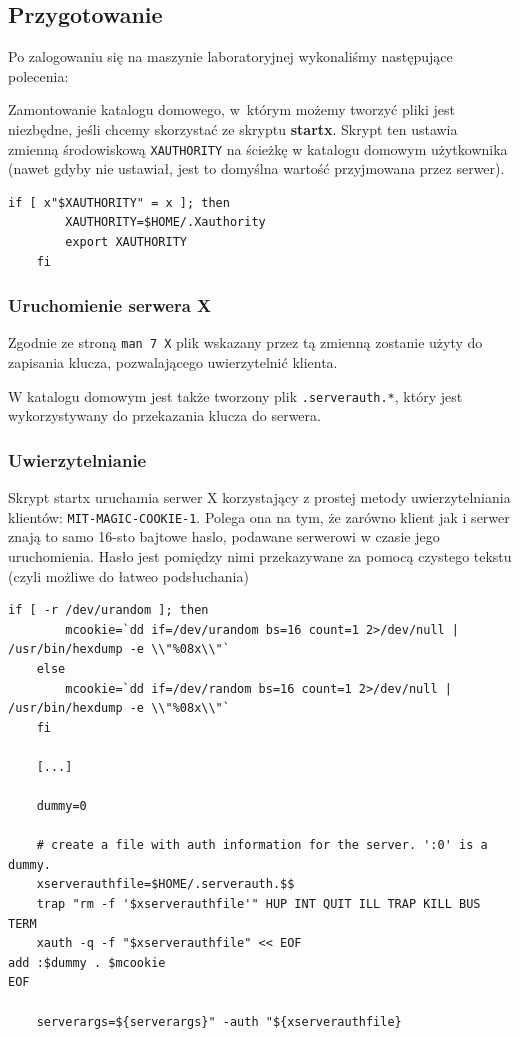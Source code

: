 \documentclass[a4paper]{article}
\begin{document}
\subsection{Przygotowanie}
Po zalogowaniu się na maszynie laboratoryjnej wykonaliśmy następujące polecenia:

Zamontowanie katalogu domowego, w~którym możemy tworzyć pliki jest niezbędne, jeśli chcemy skorzystać ze skryptu \textbf{startx}.
Skrypt ten ustawia zmienną środowiskową \texttt{XAUTHORITY} na ścieżkę w katalogu domowym użytkownika (nawet gdyby nie ustawiał, jest to domyślna wartość przyjmowana przez serwer).

\begin{lstlisting}[caption=fragment skryptu startx]
    if [ x"$XAUTHORITY" = x ]; then
        XAUTHORITY=$HOME/.Xauthority
        export XAUTHORITY
    fi
\end{lstlisting}

\subsubsection{Uruchomienie serwera X}
Zgodnie ze stroną \texttt{man 7 X} plik wskazany przez tą zmienną zostanie użyty do zapisania klucza, pozwalającego uwierzytelnić klienta.

W katalogu domowym jest także tworzony plik \texttt{.serverauth.*}, który jest wykorzystywany do przekazania klucza do serwera.

\subsubsection{Uwierzytelnianie}
Skrypt startx uruchamia serwer X korzystający z prostej metody uwierzytelniania klientów: \texttt{MIT-MAGIC-COOKIE-1}.
Polega ona na tym, że zarówno klient jak i serwer znają to samo 16-sto bajtowe haslo, podawane serwerowi w czasie jego uruchomienia.
Hasło jest pomiędzy nimi przekazywane za pomocą czystego tekstu (czyli możliwe do łatweo podsłuchania)
\begin{lstlisting}[caption={ fragmenty skryptu startx generujące współdzielony klucz, zapisujące go w pliku i dodające ten plik do argumentów wywołania serwera X }]
    if [ -r /dev/urandom ]; then
        mcookie=`dd if=/dev/urandom bs=16 count=1 2>/dev/null | /usr/bin/hexdump -e \\"%08x\\"`
    else
        mcookie=`dd if=/dev/random bs=16 count=1 2>/dev/null | /usr/bin/hexdump -e \\"%08x\\"`
    fi

    [...]

    dummy=0

    # create a file with auth information for the server. ':0' is a dummy.
    xserverauthfile=$HOME/.serverauth.$$
    trap "rm -f '$xserverauthfile'" HUP INT QUIT ILL TRAP KILL BUS TERM
    xauth -q -f "$xserverauthfile" << EOF
add :$dummy . $mcookie
EOF

    serverargs=${serverargs}" -auth "${xserverauthfile}

\end{lstlisting}
\end{document}

